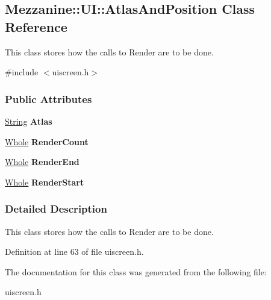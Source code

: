 \hypertarget{structMezzanine_1_1UI_1_1AtlasAndPosition}{
\subsection{Mezzanine::UI::AtlasAndPosition Class Reference}
\label{structMezzanine_1_1UI_1_1AtlasAndPosition}
}


This class stores how the calls to Render are to be done.  




{\ttfamily \#include $<$uiscreen.h$>$}

\subsubsection*{Public Attributes}
\begin{DoxyCompactItemize}
\item 
\hypertarget{structMezzanine_1_1UI_1_1AtlasAndPosition_a680f54c9463477a35a9a574ae583588f}{
\hyperlink{namespaceMezzanine_acf9fcc130e6ebf08e3d8491aebcf1c86}{String} {\bfseries Atlas}}
\label{structMezzanine_1_1UI_1_1AtlasAndPosition_a680f54c9463477a35a9a574ae583588f}

\item 
\hypertarget{structMezzanine_1_1UI_1_1AtlasAndPosition_af41c956ddefe7501856fee78c12dab20}{
\hyperlink{namespaceMezzanine_adcbb6ce6d1eb4379d109e51171e2e493}{Whole} {\bfseries RenderCount}}
\label{structMezzanine_1_1UI_1_1AtlasAndPosition_af41c956ddefe7501856fee78c12dab20}

\item 
\hypertarget{structMezzanine_1_1UI_1_1AtlasAndPosition_a052259b75c1142bb321b1a67725c66e8}{
\hyperlink{namespaceMezzanine_adcbb6ce6d1eb4379d109e51171e2e493}{Whole} {\bfseries RenderEnd}}
\label{structMezzanine_1_1UI_1_1AtlasAndPosition_a052259b75c1142bb321b1a67725c66e8}

\item 
\hypertarget{structMezzanine_1_1UI_1_1AtlasAndPosition_a8b2ea6b340c5e2002b5f05b26d64420a}{
\hyperlink{namespaceMezzanine_adcbb6ce6d1eb4379d109e51171e2e493}{Whole} {\bfseries RenderStart}}
\label{structMezzanine_1_1UI_1_1AtlasAndPosition_a8b2ea6b340c5e2002b5f05b26d64420a}

\end{DoxyCompactItemize}


\subsubsection{Detailed Description}
This class stores how the calls to Render are to be done. 

Definition at line 63 of file uiscreen.h.



The documentation for this class was generated from the following file:\begin{DoxyCompactItemize}
\item 
uiscreen.h\end{DoxyCompactItemize}
